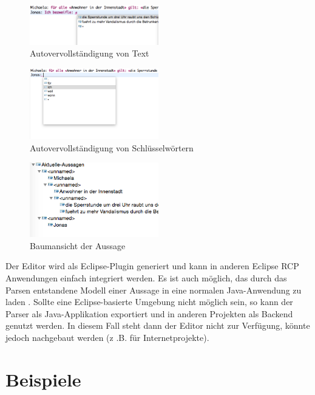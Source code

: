 \documentclass[11pt,a4paper,bibtotocnumbered]{scrreprt}
\begin{document}
\begin{figure}[htbp]
\centering
\includegraphics[width=0.5\textwidth]{img/completion2.png}
\caption{Autovervollständigung von Text}
\label{completion2}
\end{figure}

\begin{figure}[htbp]
\centering
\includegraphics[width=0.5\textwidth]{img/completion1.png}
\caption{Autovervollständigung von Schlüsselwörtern}
\label{completion1}
\end{figure}

\begin{figure}[htbp]
\centering
\includegraphics[width=0.5\textwidth]{img/outline.png}
\caption{Baumansicht der Aussage}
\label{outline}
\end{figure}

Der Editor wird als Eclipse-Plugin generiert und kann in anderen Eclipse RCP Anwendungen einfach integriert werden.
Es ist auch möglich, das durch das Parsen entstandene Modell einer Aussage in eine normalen Java-Anwendung zu laden \cite{XtextLoadJava}.
Sollte eine Eclipse-basierte Umgebung nicht möglich sein, so kann der Parser als Java-Applikation exportiert und in anderen Projekten als Backend genutzt werden.
In diesem Fall steht dann der Editor nicht zur Verfügung, könnte jedoch nachgebaut werden (z .B. für Internetprojekte).


\section{Beispiele}
\end{document}
